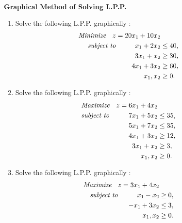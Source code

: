 \documentclass[11pt, a4paper]{article}
\author{}
\date{}
\begin{document}

\begin{center}

\textbf{\huge Graphical Method of Solving L.P.P.}

\end{center}


\vspace{50pt}


\begin{enumerate}



\item Solve the following L.P.P. graphically :
	\begin{align*}
\textit{Minimize \hspace{6pt}} z = 20x_1 + 10x_2 \\
\textit{subject to \hspace{25pt}} x_1 + 2x_2 &\leq 40, \\
3x_1 + x_2 &\geq 30, \\
4x_1 + 3x_2 &\geq 60, \\
x_1, x_2 &\geq 0.
	\end{align*}
	

\vspace{20pt}


\item Solve the following L.P.P. graphically :
	\begin{align*}
\textit{Maximize \hspace{6pt}} z = 6x_1 + 4x_2 \\
\textit{subject to \hspace{25pt}} 7x_1 + 5x_2 &\leq 35, \\
5x_1 + 7x_2 &\leq 35, \\
4x_1 + 3x_2 &\geq 12, \\
3x_1 + x_2 &\geq 3, \\
x_1, x_2 &\geq 0.
	\end{align*}
	
\vspace{20pt}


\item Solve the following L.P.P. graphically :
	\begin{align*}
\textit{Maximize \hspace{6pt}} z = 3x_1 + 4x_2 \\
\textit{subject to \hspace{25pt}} x_1 - x_2 &\geq 0, \\
-x_1 + 3x_2 &\leq 3, \\
x_1, x_2 &\geq 0.
	\end{align*}
	


\end{enumerate}
\end{document}
